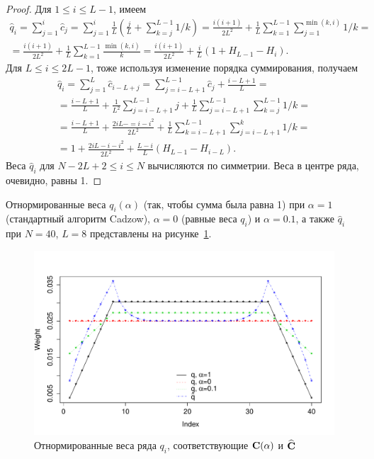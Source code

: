 \documentclass[12pt, specialist, subf,href,colorlinks=true,substylefile = spbu.rtx]{disser}
\theoremstyle{remark}
\theoremstyle{definition}
\begin{document}
\begin{proof}
Для $1 \le i \le L-1$, имеем
\begin{gather*}
\hat{q}_i = \sum_{j=1}^i \hat{c}_j = \sum_{j=1}^i \frac{1}{L}\left(\frac{j}{L} + \sum_{k=j}^{L-1}1/k\right)\! =
\frac{i(i+1)}{2L^2}+\frac{1}{L} \sum_{k = 1}^{L-1} \sum_{j=1}^{\min(k,i)} 1/k =\\= \frac{i(i+1)}{2L^2}+\frac{1}{L} \sum_{k = 1}^{L-1} \frac{\min(k,i)}{k} = \frac{i(i+1)}{2 L^2} + \frac{i}{L}(1 + H_{L-1} - H_i).
\end{gather*}
Для $L \le i \le 2L-1$, тоже используя изменение порядка суммирования, получаем
\begin{gather*}
\hat{q}_i = \sum_{j = 1}^L \hat{c}_{i-L+j} = \sum_{j = i - L + 1}^{L - 1} \hat{c}_j + \frac{i - L + 1}{L} =\\
=\frac{i - L + 1}{L} + \frac{1}{L^2} \sum_{j = i - L + 1}^{L-1}j + \frac{1}{L} \sum_{j = i-L + 1}^{L-1} \sum_{k=j}^{L-1}1/k =\\
=\frac{i - L + 1}{L} + \frac{2iL - =i - i^2}{2L^2} + \frac{1}{L} \sum_{k = i - L + 1}^{L - 1} \sum_{j = i - L + 1}^k 1/k =\\
=1 + \frac{2iL-i-i^2}{2L^2} + \frac{L-i}{L}(H_{L-1} - H_{i - L}).
\end{gather*}
	Веса $\hat{q}_i$ для $N-2L+2 \le i \le N$ вычисляются по симметрии. Веса в центре ряда, очевидно, равны 1.
\end{proof}

Отнормированные веса $q_i(\alpha)$ (так, чтобы сумма была равна 1) при $\alpha = 1$ (стандартный алгоритм Cadzow), $\alpha = 0$ (равные веса $q_i$) и $\alpha = 0.1$,
 а также $\hat{q}_i$ при $N = 40$, $L = 8$ представлены на рисунке~\ref{img_weights}.
\begin{figure}[!h] \begin{center}
\includegraphics[width = \textwidth]{weights.pdf}\caption{Отнормированные веса ряда $q_i$, соответствующие $\mathbf{C}(\alpha)$ и $\widehat{\mathbf{C}}$}\label{img_weights}
\end{center}\end{figure}
\end{document}
